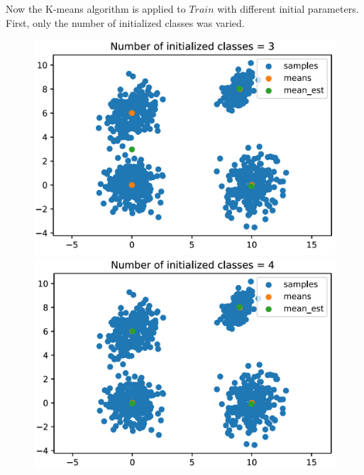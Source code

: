 \documentclass[DIV=12, ngerman, fontsize=12pt, parskip=half]{scrreprt}
\begin{document}
	Now the K-means algorithm is applied to $Train$ with different initial parameters. First, only the number of initialized classes was varied. 
	\begin{figure}[H]
		\begin{center}
			\begin{minipage}[t]{0.35\textwidth}
				\includegraphics[width=\textwidth]{Task3_classes3_png}
			\end{minipage}
			\begin{minipage}[t]{0.35\textwidth}
				\includegraphics[width=\textwidth]{Task3_classes4_png}
			\end{minipage}
			\begin{minipage}[b]{0.35\textwidth}

\end{minipage}
\end{center}
\end{figure}
\end{document}
